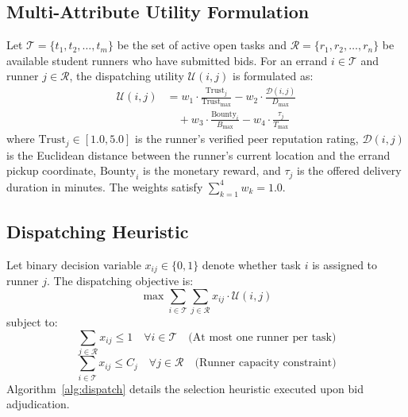 \documentclass[conference]{IEEEtran}
\begin{document}
\subsection{Multi-Attribute Utility Formulation}
Let $\mathcal{T} = \{t_1, t_2, \dots, t_m\}$ be the set of active open tasks and $\mathcal{R} = \{r_1, r_2, \dots, r_n\}$ be available student runners who have submitted bids. For an errand $i \in \mathcal{T}$ and runner $j \in \mathcal{R}$, the dispatching utility $\mathcal{U}(i, j)$ is formulated as:
\begin{equation}
\begin{aligned}
    \mathcal{U}(i, j) &= w_1 \cdot \frac{\text{Trust}_j}{\text{Trust}_{\max}} - w_2 \cdot \frac{\mathcal{D}(i, j)}{D_{\max}} \\
    &\quad + w_3 \cdot \frac{\text{Bounty}_i}{B_{\max}} - w_4 \cdot \frac{\tau_j}{T_{\max}}
\end{aligned}
\end{equation}
where $\text{Trust}_j \in [1.0, 5.0]$ is the runner's verified peer reputation rating, $\mathcal{D}(i, j)$ is the Euclidean distance between the runner's current location and the errand pickup coordinate, $\text{Bounty}_i$ is the monetary reward, and $\tau_j$ is the offered delivery duration in minutes. The weights satisfy $\sum_{k=1}^4 w_k = 1.0$.

\subsection{Dispatching Heuristic}
Let binary decision variable $x_{ij} \in \{0, 1\}$ denote whether task $i$ is assigned to runner $j$. The dispatching objective is:
\begin{equation}
    \max \sum_{i \in \mathcal{T}} \sum_{j \in \mathcal{R}} x_{ij} \cdot \mathcal{U}(i, j)
\end{equation}
subject to:
\begin{equation}
    \sum_{j \in \mathcal{R}} x_{ij} \le 1 \quad \forall i \in \mathcal{T} \quad \text{(At most one runner per task)}
\end{equation}
\begin{equation}
    \sum_{i \in \mathcal{T}} x_{ij} \le C_j \quad \forall j \in \mathcal{R} \quad \text{(Runner capacity constraint)}
\end{equation}
Algorithm~\ref{alg:dispatch} details the selection heuristic executed upon bid adjudication.
\end{document}
